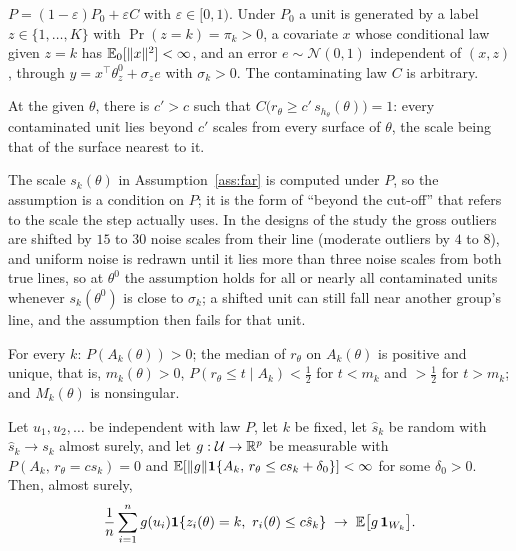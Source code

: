 \begin{assumption}
\label{ass:clean}
$P=(1-\varepsilon)P_0+\varepsilon C$ with $\varepsilon\in[0,1)$. Under $P_0$ a unit is
generated by a label $z\in\{1,\dots,K\}$ with $\Pr(z=k)=\pi_k>0$, a covariate $x$ whose
conditional law given $z=k$ has $\mathbb{E}_0[\|x\|^{2}]<\infty$, and an error $e\sim\mathcal N(0,1)$
independent of $(x,z)$, through $y=x^{\top}\theta^{0}_z+\sigma_ze$ with $\sigma_k>0$. The
contaminating law $C$ is arbitrary.
\end{assumption}

\begin{assumption}
\label{ass:far}
At the given $\theta$, there is $c'>c$ such that
$C\bigl(r_\theta\ge c'\,s_{h_\theta}(\theta)\bigr)=1$: every contaminated unit lies beyond
$c'$ scales from every surface of $\theta$, the scale being that of the surface nearest to it.
\end{assumption}

The scale $s_k(\theta)$ in Assumption~\ref{ass:far} is computed under $P$, so the
assumption is a condition on $P$; it is the form of ``beyond the cut-off'' that refers to the
scale the step actually uses. In the designs of the study the gross outliers are shifted by $15$
to $30$ noise scales from their line (moderate outliers by $4$ to $8$), and uniform noise is
redrawn until it lies more than three noise scales from both true lines, so at $\theta^{0}$ the
assumption holds for all or nearly all contaminated units whenever $s_k(\theta^{0})$ is close to
$\sigma_k$; a shifted unit can still fall near another group's line, and the assumption then
fails for that unit.

\begin{assumption}
\label{ass:reg}
For every $k$: $P(A_k(\theta))>0$; the median of $r_\theta$ on $A_k(\theta)$ is positive and
unique, that is, $m_k(\theta)>0$, $P(r_\theta\le t\mid A_k)<\tfrac12$ for $t<m_k$ and
$>\tfrac12$ for $t>m_k$; and $M_k(\theta)$ is nonsingular.
\end{assumption}

\begin{lemma}
\label{lem:plugin}
Let $u_1,u_2,\dots$ be independent with law $P$, let $k$ be fixed, let $\hat s_k$ be random
with $\hat s_k\to s_k$ almost surely, and let $g:\mathcal U\to\mathbb{R}^{p}$ be measurable with
$P(A_k,\,r_\theta=cs_k)=0$ and $\mathbb{E}[\|g\|\mathbf{1}\{A_k,\,r_\theta\le cs_k+\delta_0\}]<\infty$ for
some $\delta_0>0$. Then, almost surely,
\[
\frac1n\sum_{i=1}^{n}g(u_i)\one\{z_i(\theta)=k,\ r_i(\theta)\le c\hat s_k\}
\;\to\;\E\bigl[g\,\one_{W_k}\bigr].
\]
\end{lemma}

